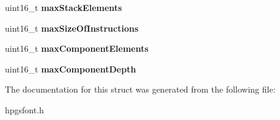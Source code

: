 \begin{DoxyCompactItemize}
\item 
uint16\_\-t {\bfseries maxStackElements}\label{structhpgs__font__maxp__data__st_add312815dda386245f35aad53384cecf}

\item 
uint16\_\-t {\bfseries maxSizeOfInstructions}\label{structhpgs__font__maxp__data__st_a92777d4c0341a7ab055f6a54db8ce65b}

\item 
uint16\_\-t {\bfseries maxComponentElements}\label{structhpgs__font__maxp__data__st_a2b9e5d6d1b0e9a7b10ac5cb3110b5577}

\item 
uint16\_\-t {\bfseries maxComponentDepth}\label{structhpgs__font__maxp__data__st_ab06f9d11c63864745325b4cce68c328d}

\end{DoxyCompactItemize}


The documentation for this struct was generated from the following file:\begin{DoxyCompactItemize}
\item 
hpgsfont.h\end{DoxyCompactItemize}
